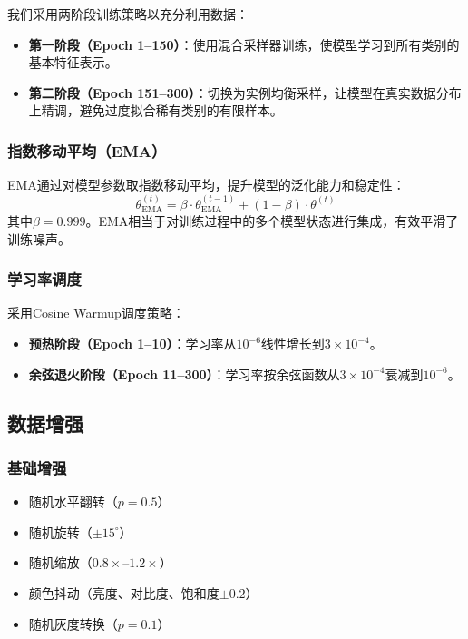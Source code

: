 \documentclass[12pt,a4paper]{article}
\begin{document}
我们采用两阶段训练策略以充分利用数据：
\begin{itemize}
    \item \textbf{第一阶段（Epoch 1--150）}：使用混合采样器训练，使模型学习到所有类别的基本特征表示。
    \item \textbf{第二阶段（Epoch 151--300）}：切换为实例均衡采样，让模型在真实数据分布上精调，避免过度拟合稀有类别的有限样本。
\end{itemize}

\subsubsection{指数移动平均（EMA）}

EMA通过对模型参数取指数移动平均，提升模型的泛化能力和稳定性：
\begin{equation}
    \theta_{\text{EMA}}^{(t)} = \beta \cdot \theta_{\text{EMA}}^{(t-1)} + (1 - \beta) \cdot \theta^{(t)}
\end{equation}
其中$\beta = 0.999$。EMA相当于对训练过程中的多个模型状态进行集成，有效平滑了训练噪声。

\subsubsection{学习率调度}

采用Cosine Warmup调度策略：
\begin{itemize}
    \item \textbf{预热阶段（Epoch 1--10）}：学习率从$10^{-6}$线性增长到$3 \times 10^{-4}$。
    \item \textbf{余弦退火阶段（Epoch 11--300）}：学习率按余弦函数从$3 \times 10^{-4}$衰减到$10^{-6}$。
\end{itemize}

\subsection{数据增强}

\subsubsection{基础增强}

\begin{itemize}
    \item 随机水平翻转（$p=0.5$）
    \item 随机旋转（$\pm 15^{\circ}$）
    \item 随机缩放（$0.8\times$--$1.2\times$）
    \item 颜色抖动（亮度、对比度、饱和度$\pm 0.2$）
    \item 随机灰度转换（$p=0.1$）
\end{itemize}
\end{document}
